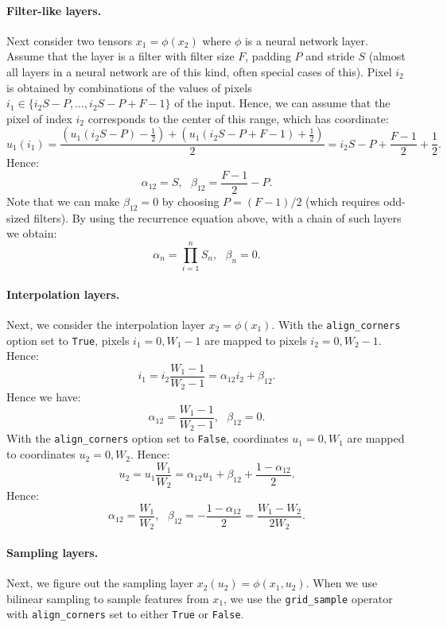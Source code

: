 \paragraph{Filter-like layers.}

Next consider two tensors $x_1 = \phi(x_2)$ where $\phi$ is a neural network layer.
Assume that the layer is a filter with filter size $F$, padding $P$ and stride $S$ (almost all layers in a neural network are of this kind, often special cases of this).
Pixel $i_2$ is obtained by combinations of the values of pixels $i_1 \in \{ i_2 S - P,\dots,i_2 S - P + F-1 \}$ of the input.
Hence, we can assume that the pixel of index $i_2$ corresponds to the center of this range, which has coordinate:
$$
u_1(i_1)
= \frac{
\left(u_1(i_2 S - P) - \frac{1}{2}\right) +
\left(u_1(i_2 S - P + F-1) + \frac{1}{2}\right)
}{2}
= i_2 S - P + \frac{F-1}{2} + \frac{1}{2}.
$$
Hence:
$$
\boxed{\alpha_{12} = S,~~~
\beta_{12} = \frac{F-1}{2} - P}.
$$
Note that we can make $\beta_{12} = 0$ by choosing $P = (F-1)/2$ (which requires odd-sized filters).
By using the recurrence equation above, with a chain of such layers we obtain:
$$
\alpha_n = \prod_{i=1}^n S_n,~~~
\beta_n = 0.
$$

\paragraph{Interpolation layers.}

Next, we consider the interpolation layer $x_2 = \phi(x_1)$.
With the \texttt{align\_corners} option set to \texttt{True}, pixels $i_1=0,W_1-1$ are mapped to pixels $i_2=0,W_2-1$.
Hence:
$$
i_1
= i_2 \frac{W_1-1}{W_2-1}
= \alpha_{12}i_2 + \beta_{12}.
$$
Hence we have:
$$
\alpha_{12} = \frac{W_1-1}{W_2-1},~~~
\beta_{12} = 0.
$$
With the \texttt{align\_corners} option set to \texttt{False}, coordinates $u_1=0,W_1$ are mapped to coordinates $u_2=0,W_2$.
Hence:
$$
u_2
= u_1 \frac{W_1}{W_2}
= \alpha_{12} u_1
+ \beta_{12}
+ \frac{1 - \alpha_{12}}{2}.
$$
Hence:
$$
\alpha_{12} = \frac{W_1}{W_2},~~~
\beta_{12} = - \frac{1 - \alpha_{12}}{2}
= \frac{W_1-W_2}{2W_2}.
$$

\paragraph{Sampling layers.}

Next, we figure out the sampling layer $x_2(u_2) = \phi(x_1,u_2)$.
When we use bilinear sampling to sample features from $x_1$, we use the \texttt{grid\_sample} operator with \texttt{align\_corners} set to either \texttt{True} or \texttt{False}.

